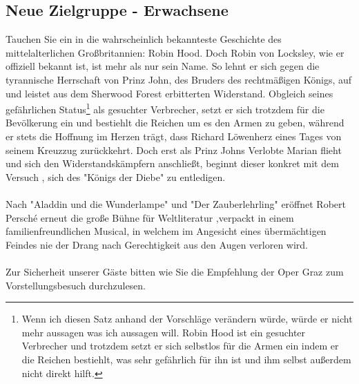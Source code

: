 \documentclass{article}
\begin{document}
\subsection*{Neue Zielgruppe - Erwachsene}
Tauchen Sie ein in die wahrscheinlich bekannteste Geschichte des mittelalterlichen Großbritannien: Robin Hood. Doch Robin von Locksley, wie er offiziell bekannt ist, ist mehr als nur sein Name. So lehnt er sich gegen die tyrannische Herrschaft von Prinz John, des Bruders des rechtmäßigen Königs{\color{red},} auf und {\color{red} leistet} aus dem Sherwood Forest {\color{red} erbitterten Widerstand}. Obgleich seines gefährlichen Status\footnote{Wenn ich diesen Satz anhand der Vorschläge verändern würde, würde er nicht mehr aussagen was ich aussagen will. Robin Hood ist ein gesuchter Verbrecher und trotzdem setzt er sich selbstlos für die Armen ein indem er die Reichen bestiehlt, was sehr gefährlich für ihn ist und ihm selbst außerdem nicht direkt hilft.} als gesuchter Verbrecher, setzt er sich trotzdem für die Bevölkerung ein und bestiehlt die Reichen um es den Armen zu geben, während er stets die Hoffnung im Herzen trägt, dass Richard Löwenherz eines Tages von seinem Kreuzzug zurückkehrt. Doch erst als Prinz Johns Verlobte Marian flieht und sich den Widerstandskämpfern anschließt, beginnt dieser konkret mit dem Versuch{\color{red} ,} sich des "Königs der Diebe" zu entledigen. \\ \\
Nach "Aladdin und die Wunderlampe" und "Der Zauberlehrling" eröffnet Robert Persché erneut die große Bühne für Weltliteratur{\color{red} ,}verpackt in einem familienfreundlichen Musical, in welchem im Angesicht eines übermächtigen Feindes nie der Drang nach Gerechtigkeit aus den Augen verloren wird. \\ \\
Zur Sicherheit unserer Gäste bitten wie Sie die Empfehlung der Oper Graz zum Vorstellungsbesuch durchzulesen. \\
\end{document}

